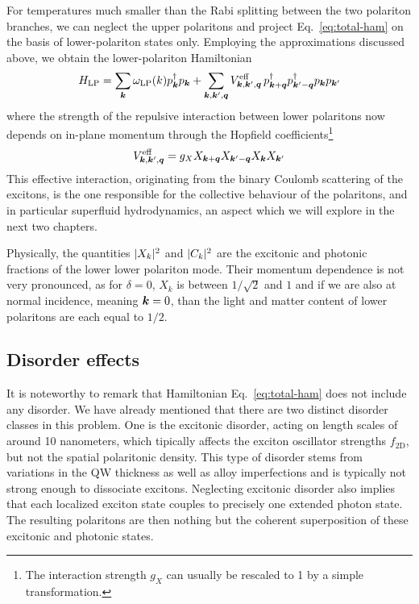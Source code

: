 
For temperatures much smaller than the Rabi splitting between the two
polariton branches, we can neglect the upper polaritons and project
Eq.~\eqref{eq:total-ham} on the basis of lower-polariton states
only. Employing the approximations discussed above, we obtain the
lower-polariton Hamiltonian
%
\begin{equation}\label{eq:LP-ham}
  H_{\text{LP}} = \sum_{\bm{k}} \omega_{\text{LP}}(k) p_{\bm{k}}^{\dagger} p_{\bm{k}} + \sum_{\bm{k},\bm{k}^{\prime},\bm{q}} V^{\text{eff}}_{\bm{k},\bm{k}^{\prime},\bm{q}}\, p^{\dagger}_{\bm{k} + \bm{q}} p^{\dagger}_{\bm{k}^{\prime} - \bm{q}} p_{\bm{k}} p_{\bm{k}^{\prime}}
\end{equation}
% 
where the strength of the repulsive interaction between lower
polaritons now depends on in-plane momentum through the Hopfield
coefficients\footnote{The interaction strength $g_X$ can usually be
  rescaled to 1 by a simple transformation.}
%
\begin{equation}\label{eq:g-eff}
  V^{\text{eff}}_{\bm{k},\bm{k}^{\prime},\bm{q}} = g_X X_{\bm{k} + \bm{q}}X_{\bm{k}^{\prime} - \bm{q}}X_{\bm{k}}X_{\bm{k}^{\prime}}
\end{equation}
% 
This effective interaction, originating from the binary Coulomb
scattering of the excitons, is the one responsible for the collective
behaviour of the polaritons, and in particular superfluid
hydrodynamics, an aspect which we will explore in the next two chapters.

Physically, the quantities $\vert X_k \vert^2$ and $\vert C_k \vert^2$ are the
excitonic and photonic fractions of the lower lower polariton
mode. Their momentum dependence is not very pronounced, as for
$\delta = 0$, $X_k$ is between $1/\sqrt{2}$ and $1$ and if we are also
at normal incidence, meaning $\bm{k} = 0$, than the light and matter
content of lower polaritons are each equal to $1/2$.

\subsection{Disorder effects}
\label{subsec:disorder}


It is noteworthy to remark that Hamiltonian Eq.~\eqref{eq:total-ham}
does not include any disorder. We have already mentioned that there
are two distinct disorder classes in this problem. One is the
excitonic disorder, acting on length scales of around 10 nanometers,
which tipically affects the exciton oscillator strengths
$f_{\text{2D}}$, but not the spatial polaritonic density. This type of
disorder stems from variations in the QW thickness as well as alloy
imperfections and is typically not strong enough to dissociate
excitons. Neglecting excitonic disorder also implies that each
localized exciton state couples to precisely one extended photon
state. The resulting polaritons are then nothing but the coherent
superposition of these excitonic and photonic states.

